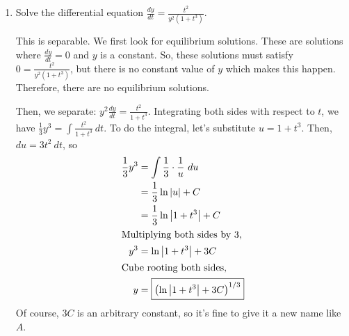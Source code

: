\documentclass[main]{subfiles}
\begin{document}
\begin{enumerate}
\begin{enumerate}
\begin{solution}
  \end{solution}
  \end{enumerate}

  \item 
  
  \begin{problem}[2.5in]
  Solve the differential equation $\displaystyle \frac{dy}{dt} =
  \frac{t^2}{y^2 (1 + t^3)}$.
  \end{problem}

  \begin{solution}
  This is separable.  We first look for equilibrium solutions.  These
  are solutions where $\frac{dy}{dt} = 0$ and $y$ is a constant.  So,
  these solutions must satisfy $0 = \frac{t^2}{y^2 (1 + t^3)}$, but
  there is no constant value of $y$ which makes this happen.  Therefore,
  there are no equilibrium solutions.

  Then, we separate: $y^2 \frac{dy}{dt} = \frac{t^2}{1 + t^3}$.  Integrating
  both sides with respect to $t$, we have 
  $\displaystyle \frac{1}{3} y^3 = \int \frac{t^2}{1 +
  t^3}~dt$.  To do the integral, let's substitute $u = 1 + t^3$.
  Then, $du = 3t^2~dt$, so
  \begin{align*}
  \frac{1}{3} y^3 &= \int \frac{1}{3} \cdot \frac{1}{u}~du \\
  &= \frac{1}{3} \ln |u| + C \\
  &= \frac{1}{3} \ln \left|1 + t^3\right| + C \\
  \shortintertext{Multiplying both sides by $3$,}
  y^3 &= \ln \left|1 + t^3\right| + 3C \\
  \shortintertext{Cube rooting both sides,}
  y &= \boxed{\left( \ln \left|1 + t^3\right| + 3C \right)^{1/3}}
  \end{align*}
  Of course, $3C$ is an arbitrary constant, so it's fine to give it a
  new name like $A$. 
  \end{solution}


\end{enumerate}
\end{document}
